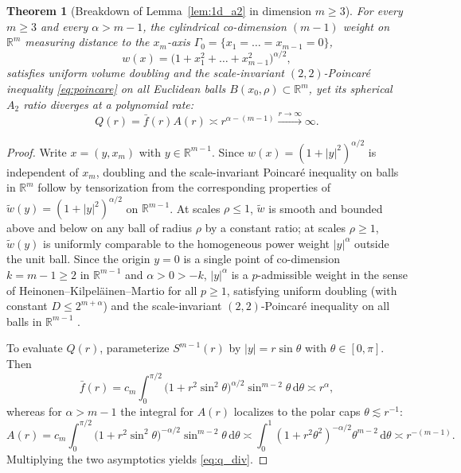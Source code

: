 \documentclass[a4paper,11pt,noarxiv]{quantumarticle}
\newcommand{\R}{\mathbb{R}}
\newcommand{\abs}[1]{\lvert #1\rvert}
\newcommand{\dd}{\,\mathrm{d}}
\newcommand{\fbar}{\bar f}
\theoremstyle{plain}
\newtheorem{theorem}{Theorem}
\theoremstyle{definition}
\theoremstyle{remark}
\begin{document}
\begin{theorem}[Breakdown of Lemma~\ref{lem:1d_a2} in dimension $m\ge3$]
\label{thm:codim2_unbounded}
For every $m\ge3$ and every $\alpha>m-1$, the cylindrical co-dimension
$(m-1)$ weight on $\R^m$ measuring distance to the $x_m$-axis
$\Gamma_0=\{x_1=\dots=x_{m-1}=0\}$,
\begin{equation}\label{eq:cyl_weight}
w(x)=\bigl(1+x_1^2+\dots+x_{m-1}^2\bigr)^{\alpha/2},
\end{equation}
satisfies uniform volume doubling and the scale-invariant $(2,2)$-Poincar\'e
inequality \eqref{eq:poincare} on all Euclidean balls $B(x_0,\rho)\subset\R^m$,
yet its spherical $A_2$ ratio diverges at a polynomial rate:
\begin{equation}\label{eq:q_div}
Q(r)=\fbar(r)A(r)\asymp r^{\alpha-(m-1)}\xrightarrow{r\to\infty}\infty.
\end{equation}
\end{theorem}

\begin{proof}
Write $x=(y,x_m)$ with $y\in\R^{m-1}$. Since $w(x)=(1+\abs{y}^2)^{\alpha/2}$
is independent of $x_m$, doubling and the scale-invariant Poincar\'e
inequality on balls in $\R^m$ follow by tensorization from the
corresponding properties of $\tilde w(y)=(1+\abs{y}^2)^{\alpha/2}$ on
$\R^{m-1}$. At scales $\rho\le1$, $\tilde w$ is smooth and bounded above
and below on any ball of radius $\rho$ by a constant ratio; at scales
$\rho\ge1$, $\tilde w(y)$ is uniformly comparable to the homogeneous
power weight $\abs{y}^\alpha$ outside the unit ball. Since the origin
$y=0$ is a single point of co-dimension $k=m-1\ge2$ in $\R^{m-1}$ and
$\alpha>0>-k$, $\abs{y}^\alpha$ is a $p$-admissible weight in the sense
of Heinonen--Kilpel\"ainen--Martio for all $p\ge1$, satisfying uniform
doubling (with constant $D\le 2^{m+\alpha}$) and the scale-invariant
$(2,2)$-Poincar\'e inequality on all balls in $\R^{m-1}$
\cite{kilpelainen1994,bjorn2011}.

To evaluate $Q(r)$, parameterize $S^{m-1}(r)$ by $\abs{y}=r\sin\theta$
with $\theta\in[0,\pi]$. Then
\[
\fbar(r)=c_m\int_0^{\pi/2}\bigl(1+r^2\sin^2\theta\bigr)^{\alpha/2}
\sin^{m-2}\theta\dd\theta\asymp r^\alpha,
\]
whereas for $\alpha>m-1$ the integral for $A(r)$ localizes to the polar
caps $\theta\lesssim r^{-1}$:
\[
A(r)=c_m\int_0^{\pi/2}\bigl(1+r^2\sin^2\theta\bigr)^{-\alpha/2}
\sin^{m-2}\theta\dd\theta
\asymp\int_0^1(1+r^2\theta^2)^{-\alpha/2}\theta^{m-2}\dd\theta
\asymp r^{-(m-1)}.
\]
Multiplying the two asymptotics yields \eqref{eq:q_div}.
\end{proof}
\end{document}
